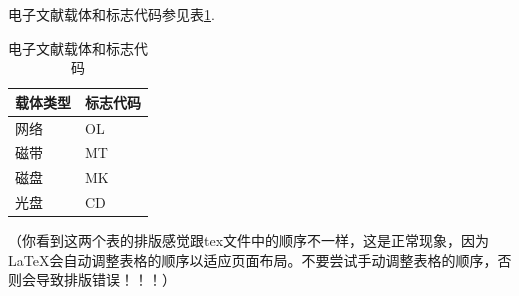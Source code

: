  电子文献载体和标志代码参见表\ref{tab:litcarrier}.
 \begin{table}[htbp]
 \centering
 \caption{电子文献载体和标志代码 \label{tab:litcarrier}}
 \begin{tabular}{ll}
 \toprule
 载体类型 & 标志代码 \\
 \midrule
 网络 & OL \\
 磁带 & MT \\
 磁盘 & MK \\
 光盘 & CD \\
 \bottomrule
 \end{tabular}
 \end{table}

 （你看到这两个表的排版感觉跟tex文件中的顺序不一样，这是正常现象，因为\LaTeX 会自动调整表格的顺序以适应页面布局。不要尝试手动调整表格的顺序，否则会导致排版错误！！！）
